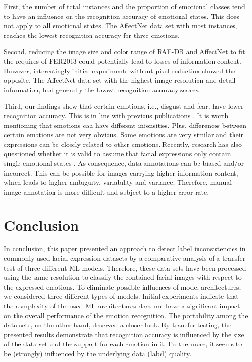 \documentclass[a4paper, conference]{IEEEtran}
\begin{document}
First, the number of total instances and the proportion of emotional classes tend to have an influence on the recognition accuracy of emotional states. This does not apply to all emotional states. The AffectNet data set with most instances, reaches the lowest recognition accuracy for three emotions.

Second, reducing the image size and color range of RAF-DB and AffectNet to fit the requires of FER2013 could potentially lead to losses of information content. However, interestingly initial experiments without pixel reduction showed the opposite. The AffectNet data set with the highest image resolution and detail information, had generally the lowest recognition accuracy scores.

Third, our findings show that certain emotions, i.e., disgust and fear, have lower recognition accuracy. This is in line with previous publications \cite{khaireddinFacialEmotionRecognition2021,knyazevConvolutionalNeuralNetworks2017}. It is worth mentioning that emotions can have different intensities. Plus, differences between certain emotions are not very obvious. Some emotions are very similar and their expressions can be closely related to other emotions. Recently, research has also questioned whether it is valid to assume that facial expressions only contain single emotional states \cite{ekundayoFacialExpressionRecognition2021}. As consequence, data annotations can be biased and/or incorrect. This can be possible for images carrying higher information content, which leads to higher ambiguity, variability and variance. Therefore, manual image annotation is more difficult and subject to a higher error rate.



\section{Conclusion}
In conclusion, this paper presented an approach to detect label inconsistencies in commonly used facial expression datasets by a comparative analysis of a transfer test of three different ML models. Therefore, these data sets have been processed using the same resolution to classify the contained facial images with respect to the expressed emotions. To eliminate possible influences of model architectures, we considered three different types of models. Initial experiments indicate that the complexity of the used ML architectures does not have a significant impact on the overall performance of the emotion recognition. The portability among the data sets, on the other hand, deserved a closer look. By transfer testing, the presented results demonstrate that recognition accuracy is influenced by the size of the data set and the support for each emotion in it. Furthermore, it seems to be (strongly) influenced by the underlying data (label) quality.
\end{document}
